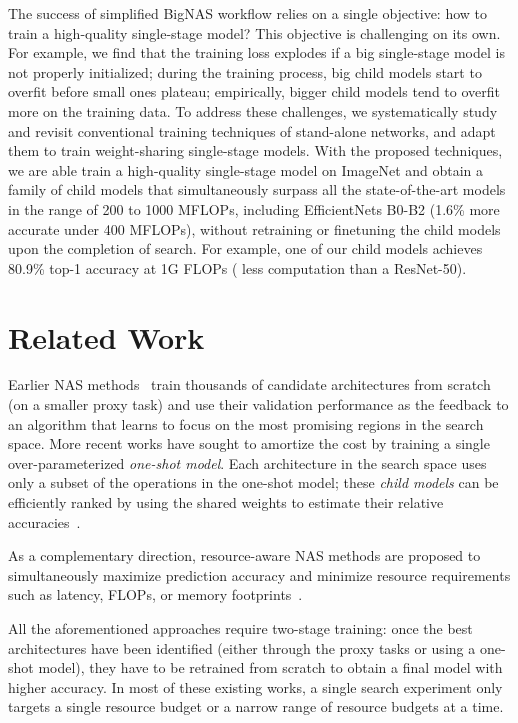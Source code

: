 \documentclass[runningheads]{llncs}
\begin{document}
The success of simplified BigNAS workflow relies on a single objective: how to train a high-quality single-stage model? This objective is challenging on its own. For example, we find that the training loss explodes if a big single-stage model is not properly initialized; during the training process, big child models start to overfit before small ones plateau; empirically, bigger child models tend to overfit more on the training data. To address these challenges, we systematically study and revisit conventional training techniques of stand-alone networks, and adapt them to train weight-sharing single-stage models. With the proposed techniques, we are able train a high-quality single-stage model on ImageNet and obtain a family of child models that simultaneously surpass all the state-of-the-art models in the range of 200 to 1000 MFLOPs, including EfficientNets B0-B2 (1.6\% more accurate under 400 MFLOPs), without retraining or finetuning the child models upon the completion of search. For example, one of our child models achieves 80.9\% top-1 accuracy at 1G FLOPs ( less computation than a ResNet-50).
 
\section{Related Work}
Earlier NAS methods~\cite{zoph2016neural, zoph2018learning, liu2017hierarchical, liu2018progressive, real2018regularized} train thousands of candidate architectures from scratch (on a smaller proxy task) and use their validation performance as the feedback to an algorithm that learns to focus on the most promising regions in the search space. More recent works have sought to amortize the cost by training a single over-parameterized \emph{one-shot model}. Each architecture in the search space uses only a subset of the operations in the one-shot model; these \emph{child models} can be efficiently ranked by using the shared weights to estimate their relative accuracies~\cite{brock2018smash, pham2018efficient, bender2018understanding, liu2018darts, cai2018proxylessnas, wu2019fbnet, yu2019network, hu2020dsnas, Yang_2020_CVPR}.

As a complementary direction, resource-aware NAS methods are proposed to simultaneously maximize prediction accuracy and minimize resource requirements such as latency, FLOPs, or memory footprints~\cite{tan2018mnasnet, cai2019once, wu2019fbnet, stamoulis2019single, guo2019single, yu2019network, Berman_2020_CVPR}.

All the aforementioned approaches require two-stage training: once the best architectures have been identified (either through the proxy tasks or using a one-shot model), they have to be retrained from scratch to obtain a final model with higher accuracy. In most of these existing works, a single search experiment only targets a single resource budget or a narrow range of resource budgets at a time.
\end{document}
